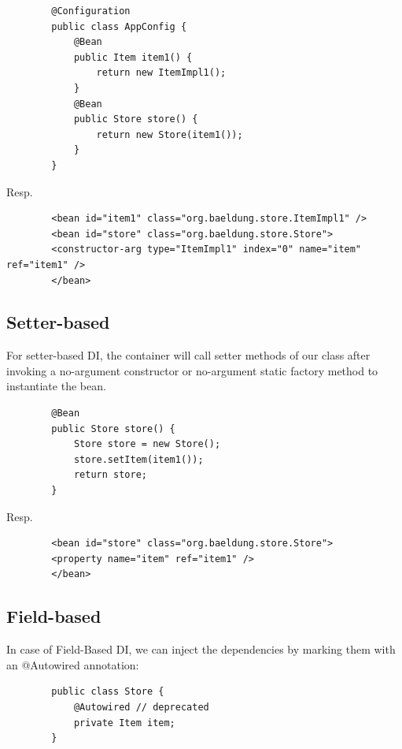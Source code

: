 \documentclass{scrartcl}
\begin{document}
    \begin{lstlisting}
        @Configuration
        public class AppConfig {
            @Bean
            public Item item1() {
                return new ItemImpl1();
            }
            @Bean
            public Store store() {
                return new Store(item1());
            }
        }
    \end{lstlisting}

    Resp.

    \begin{lstlisting}
        <bean id="item1" class="org.baeldung.store.ItemImpl1" />
        <bean id="store" class="org.baeldung.store.Store">
        <constructor-arg type="ItemImpl1" index="0" name="item" ref="item1" />
        </bean>
    \end{lstlisting}

\subsection{Setter-based}

    For setter-based DI, the container will call setter methods of our class after invoking a no-argument constructor or no-argument static factory method to instantiate the bean.

    \begin{lstlisting}
        @Bean
        public Store store() {
            Store store = new Store();
            store.setItem(item1());
            return store;
        }
    \end{lstlisting}

    Resp.

    \begin{lstlisting}
        <bean id="store" class="org.baeldung.store.Store">
        <property name="item" ref="item1" />
        </bean>
    \end{lstlisting}

\subsection{Field-based}

    In case of Field-Based DI, we can inject the dependencies by marking them with an @Autowired annotation:

    \begin{lstlisting}
        public class Store {
            @Autowired // deprecated
            private Item item;
        }
    \end{lstlisting}
\end{document}
